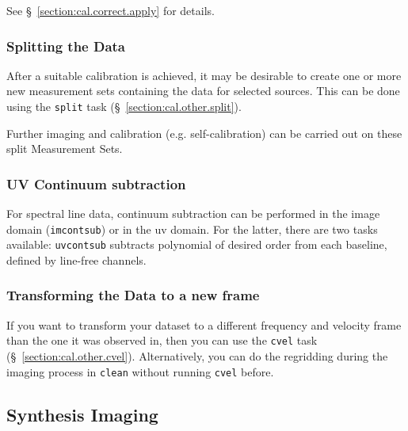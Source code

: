 See \S~\ref{section:cal.correct.apply} for details.
 

 

\subsubsection{Splitting the Data}
\label{section:intro.walkthru.calib.split}

After a suitable calibration is achieved, it may be desirable to
create one or more new measurement sets containing the data for
selected sources.  This can be done using the {\tt split} task
(\S~\ref{section:cal.other.split}).

Further imaging and calibration (e.g. self-calibration) can be
carried out on these split Measurement Sets.


\subsubsection{UV Continuum subtraction}
\label{section:intro.walkthru.calib.uvcontsub}

For spectral line data, continuum subtraction can be performed in the
image domain ({\tt imcontsub}) or in the uv domain. For the latter,
there are two tasks available: {\tt uvcontsub} subtracts polynomial of
desired order from each baseline, defined by line-free channels. 


\subsubsection{Transforming the Data to a new frame}
\label{section:intro.walkthru.calib.cvel}

If you want to transform your dataset to a different frequency and
velocity frame than the one it was observed in, then you can use
the {\tt cvel} task
(\S~\ref{section:cal.other.cvel}). Alternatively, you can do the
regridding during the imaging process in {\tt clean} without running
{\tt cvel} before.


\subsection{Synthesis Imaging}
\label{section:intro.walkthru.image}


